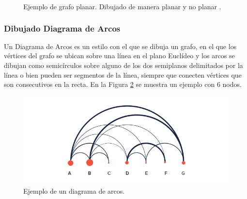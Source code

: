 \begin{figure}[h]
	\centering
	\caption{Ejemplo de grafo planar. Dibujado de manera planar y no planar \cite{nishizeki2004planar}.}
	\label{fig:ejemplo_dibujado_planar}
\end{figure}

\subsubsection{Dibujado Diagrama de Arcos}
\label{sec:dibujado_diagrama_de_arcos}

Un Diagrama de Arcos \cite{Wat02} es un estilo con el  que se dibuja un grafo, en el que los vértices del grafo se ubican sobre  una línea en el plano  Euclídeo y los arcos se dibujan como  semicírculos sobre alguno de los dos  semiplanos delimitados por la línea o bien pueden ser segmentos de la línea, siempre que conecten vértices que son consecutivos en la recta.
En la Figura \ref{fig:arcdiagram_ejemplo} se muestra un ejemplo con 6 nodos.

\begin{figure}[h]
	\centering
	\includegraphics[width=12cm]{imagenes/diagrama-de-arco.jpg}
	\caption{Ejemplo de un diagrama de arcos.}
	\label{fig:arcdiagram_ejemplo}
\end{figure}

